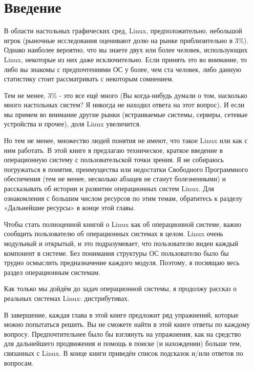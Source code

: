 \documentclass[12pt]{book}
\begin{document}

\onehalfspacing %

\section*{Введение}

В области настольных графических сред, Linux, предположительно, небольшой игрок (рыночные исследования оценивают долю на рынке приблизительно в 3\%). Однако наиболее вероятно, что вы знаете двух или более человек, использующих Linux, некоторые из них даже исключительно. Если принять это во внимание, то либо вы знакомы с предпочтениями ОС у более, чем ста человек, либо данную статистику стоит рассматривать с некоторым сомнением.

Тем не менее, 3\% - это все ещё много (Вы когда-нибудь думали о том, насколько много настольных систем? Я никогда не находил ответа на  этот вопрос). И если мы примем во внимание другие рынки (встраиваемые системы, серверы, сетевые устройства и прочее), доля Linux увеличится.

Но тем не менее, множество людей понятия не имеют, что такое Linux или как с ним работать. В этой книге я предлагаю техническое, краткое введение в операционную систему  с пользовательской точки зрения. Я не собираюсь погружаться в понятия, преимущества или недостатки Свободного Программного обеспечения (тем не менее, несколько абзацев не станут болезненными) и рассказывать об истории и развитии операционных систем Linux. Для ознакомления с большим числом ресурсов по этим темам, обратитесь к разделу «Дальнейшие ресурсы» в конце этой главы.

Чтобы стать полноценной книгой о Linux как об операционной системе, важно сообщить пользователю об операционных системах в целом. Linux очень модульный и открытый, и это подразумевает, что пользователю виден каждый компонент в системе. Без понимания структуры ОС пользователю было бы трудно осмыслить предназначение каждого модуля. Поэтому, я посвящаю весь раздел операционным системам.

Как только мы дойдём до задач операционной системы, я продолжу рассказ о реальных системах Linux: дистрибутивах.

В завершение, каждая глава в этой книге предложит ряд упражнений, которые можно попытаться решить. Вы не сможете найти в этой книге ответы по каждому вопросу. Предпочтительнее было бы взглянуть на упражнения, как на средство для дальнейшего продвижения и помощь в поиске (и нахождении) больше тем, связанных с Linux. В конце книги приведён список подсказок и/или ответов по вопросам.
\end{document}

